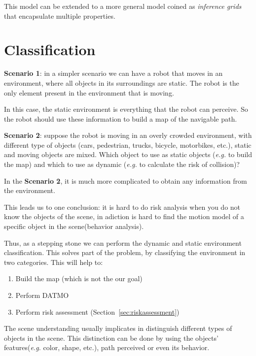 This model can be extended to a more general model coined as \textit{inference grids} that encapsulate multiple properties\cite{Elfes:1989:OGP:916528}.

\section{Classification}

\textbf{Scenario 1}: in a simpler scenario we can have a robot that moves in an environment, where all objects in its surroundings are static. The robot is the only element present in the environment that is moving.

In this case, the static environment is everything that the robot can perceive. So the robot should use these information to build a map of the navigable path.

\textbf{Scenario 2}: suppose the robot is moving in an overly crowded environment, with different type of objects (cars, pedestrian, trucks, bicycle, motorbikes, etc.), static and moving objects are mixed. Which object to use as static objects (\textit{e.g.} to build the map) and which to use as dynamic (\textit{e.g.} to calculate the risk of collision)? 

In the \textbf{Scenario 2}, it is much more complicated to obtain any information from the environment.

This leads us to one conclusion: it is hard to do risk analysis when you do not know the objects of the scene, in adiction is hard to find the motion model of a specific object in the scene(behavior analysis).

Thus, as a stepping stone we can perform the dynamic and static environment classification. This solves part of the problem, by classifying the environment in two categories. This will help to:

\begin{enumerate}
\item Build the map (which is not the our goal)
\item Perform DATMO
\item Perform risk assessment (Section~\ref{sec:riskassessment})
\end{enumerate}

The scene understanding usually implicates in distinguish different types of objects in the scene. This distinction can be done by using the objects' features(\textit{e.g.} color, shape, etc.), path perceived or even its behavior. 


